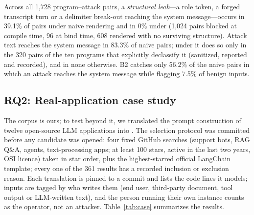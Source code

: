\documentclass[journal]{IEEEtran}
\begin{document}
\begin{table}[t]
\caption{Detection on the labelled corpus (unsafe = positive)}
\label{tab:detect}
\centering
{}
\end{table}

Across all 1{,}728 program--attack pairs, a \emph{structural leak}---a role token, a forged transcript turn or a delimiter break-out reaching the system message---occurs in 39.1\% of pairs under naive rendering and in 0\% under \TL{} (1{,}024 pairs blocked at compile time, 96 at bind time, 608 rendered with no surviving structure). Attack text reaches the system message in 83.3\% of naive pairs; under \TL{} it does so only in the 320 pairs of the ten programs that explicitly declassify it (sanitized, reported and recorded), and in none otherwise. B2 catches only 56.2\% of the naive pairs in which an attack reaches the system message while flagging 7.5\% of benign inputs.

\subsection{RQ2: Real-application case study}\label{sec:case}
The corpus is ours; to test \TL{} beyond it, we translated the prompt construction of twelve open-source LLM applications into \TL{}. The selection protocol was committed before any candidate was opened: four fixed GitHub searches (support bots, RAG Q\&A, agents, text-processing apps; at least 100 stars, active in the last two years, OSI licence) taken in star order, plus the highest-starred official LangChain template; every one of the 361 results has a recorded inclusion or exclusion reason. Each translation is pinned to a commit and lists the code lines it models; inputs are tagged by who writes them (end user, third-party document, tool output or LLM-written text), and the person running their own instance counts as the operator, not an attacker. Table~\ref{tab:case} summarizes the results.
\end{document}
